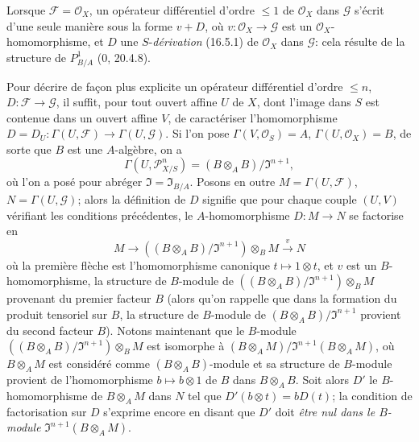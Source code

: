 Lorsque $\mathscr{F}=\mathcal{O}_X$, un opérateur différentiel d'ordre
$\leq1$ de $\mathcal{O}_X$ dans $\mathscr{G}$ s'écrit d'une seule manière
sous la forme $v+D$, où $v:\mathcal{O}_X\to\mathscr{G}$ est un
$\mathcal{O}_X$-homomorphisme, et $D$ une $S$-\emph{dérivation} (16.5.1) de
$\mathcal{O}_X$ dans $\mathscr{G}$: cela résulte de la structure de
$P_{B/A}^1$ (0, 20.4.8).

\begin{env}[16.8.2]
\label{IV.16.8.2}
Pour décrire de façon plus explicite un opérateur différentiel d'ordre
$\leq n$, $D:\mathscr{F}\to\mathscr{G}$, il suffit, pour tout ouvert affine
$U$ de $X$, dont l'image dans $S$ est contenue dans un ouvert affine $V$, de
caractériser l'homomorphisme
$D=D_U:\Gamma(U,\mathscr{F})\to\Gamma(U,\mathscr{G})$. Si l'on pose
$\Gamma(V,\mathcal{O}_S)=A$, $\Gamma(U,\mathcal{O}_X)=B$, de sorte que $B$
est une $A$-algèbre, on a
\[
  \Gamma(U,\mathscr{P}_{X/S}^n)
  =(B\otimes_A B)/\mathfrak{I}^{n+1},
\]
où l'on a posé pour abréger $\mathfrak{I}=\mathfrak{I}_{B/A}$. Posons en
outre $M=\Gamma(U,\mathscr{F})$, $N=\Gamma(U,\mathscr{G})$; alors la
définition de $D$ signifie que pour chaque couple $(U,V)$ vérifiant les
conditions précédentes, le $A$-homomorphisme $D:M\to N$ se factorise en
\[
  M\longrightarrow
  ((B\otimes_A B)/\mathfrak{I}^{n+1})\otimes_B M
  \xrightarrow{v}N
\]
où la première flèche est l'homomorphisme canonique $t\mapsto1\otimes t$, et
$v$ est un $B$-homomorphisme, la structure de $B$-module de
$((B\otimes_A B)/\mathfrak{I}^{n+1})\otimes_B M$ provenant du premier
facteur $B$ (alors qu'on rappelle que dans la formation du produit tensoriel
sur $B$, la structure de $B$-module de
$(B\otimes_A B)/\mathfrak{I}^{n+1}$ provient du second facteur $B$). Notons
maintenant que le $B$-module
$((B\otimes_A B)/\mathfrak{I}^{n+1})\otimes_B M$ est isomorphe à
$(B\otimes_A M)/\mathfrak{I}^{n+1}(B\otimes_A M)$, où $B\otimes_A M$ est
considéré comme $(B\otimes_A B)$-module et sa structure de $B$-module
provient de l'homomorphisme $b\mapsto b\otimes1$ de $B$ dans $B\otimes_A B$.
Soit alors $D'$ le $B$-homomorphisme de $B\otimes_A M$ dans $N$ tel que
$D'(b\otimes t)=bD(t)$; la condition de factorisation sur $D$ s'exprime encore
en disant que $D'$ doit \emph{être nul dans le $B$-module}
$\mathfrak{I}^{n+1}(B\otimes_A M)$.
\end{env}

